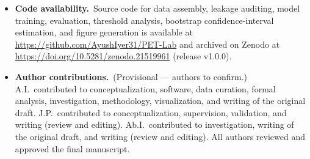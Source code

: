 \documentclass[sn-nature]{sn-jnl}%
\begin{document}
\begin{itemize}
  \item \textbf{Code availability.}\ Source code for data assembly, leakage auditing, model
        training, evaluation, threshold analysis, bootstrap confidence-interval estimation,
        and figure generation is available at \url{https://github.com/AyushIyer31/PET-Lab}
        and archived on Zenodo at \url{https://doi.org/10.5281/zenodo.21519961} (release
        v1.0.0).
  \item \textbf{Author contributions.}\ (Provisional --- authors to confirm.) A.I.\ contributed
        to conceptualization, software, data curation, formal analysis, investigation,
        methodology, visualization, and writing of the original draft. J.P.\ contributed to
        conceptualization, supervision, validation, and writing (review and editing). Ab.I.\
        contributed to investigation, writing of the original draft, and writing (review and
        editing). All authors reviewed and approved the final manuscript.
\end{itemize}

\end{document}
